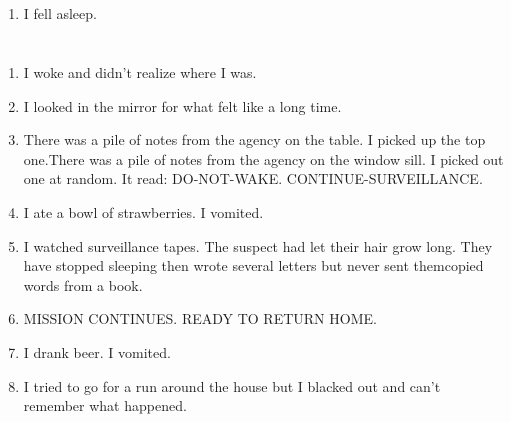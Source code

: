 \documentclass{article}
\begin{document}
    \newpage
    
    \section{}
    
    \begin{enumerate}
    
    \item I fell asleep.\\
    
    \end{enumerate}
     
    \newpage
    
    \section{}
    
    \begin{enumerate}
    
    \item I woke and didn't realize where I was.\\
    
    \item I looked in the mirror for what felt like a long time.\\
    
    \item There was a pile of notes from the agency on the table. I picked up the top one.There was a pile of notes from the agency on the window sill. I picked out one at random. It read: DO-NOT-WAKE. CONTINUE-SURVEILLANCE.\\
    
    \item I ate a bowl of strawberries. I vomited.\\
    
    \item I watched surveillance tapes. The suspect had let their hair grow long. They have stopped sleeping then wrote several letters but never sent themcopied words from a book.\\
    
    \item MISSION CONTINUES. READY TO RETURN HOME.\\
    
    \item I drank beer. I vomited.\\
    
    \item I tried to go for a run around the house but I blacked out and can't remember what happened.\\
    
    \end{enumerate}
     
\end{document}
